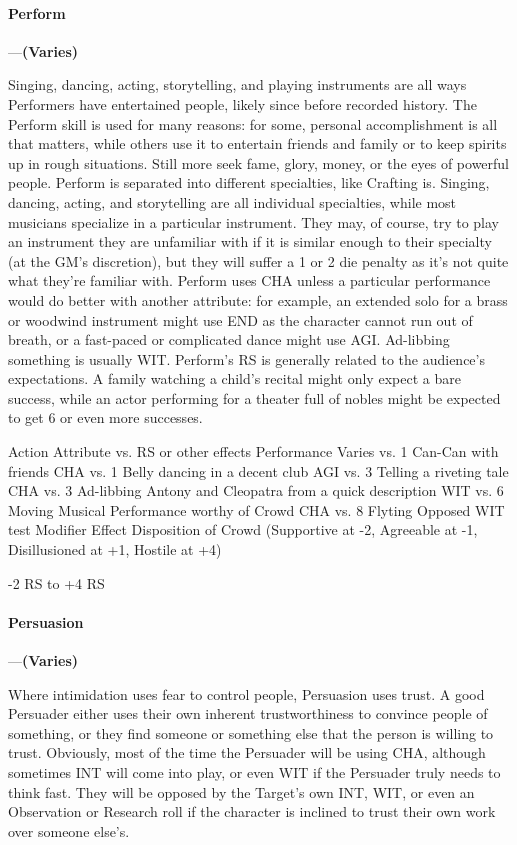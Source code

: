 \documentclass[oneside,11pt,english]{book}
\begin{document}
\paragraph{\label{skill:Perform}Perform}---\quad\textbf{(Varies) }\par
Singing, dancing, acting, storytelling, and playing instruments are all ways Performers have entertained people, likely since before recorded history. The Perform skill is used for many reasons: for some, personal accomplishment is all that matters, while others use it to entertain friends and family or to keep spirits up in rough situations. Still more seek fame, glory, money, or the eyes of powerful people. Perform is separated into different specialties, like Crafting is. Singing, dancing, acting, and storytelling are all individual specialties, while most musicians specialize in a particular instrument. They may, of course, try to play an instrument they are unfamiliar with if it is similar enough to their specialty (at the GM’s discretion), but they will suffer a 1 or 2 die penalty as it’s not quite what they’re familiar with. Perform uses CHA unless a particular performance would do better with another attribute: for example, an extended solo for a brass or woodwind instrument might use END as the character cannot run out of breath, or a fast-paced or complicated dance might use AGI. Ad-libbing something is usually WIT. Perform’s RS is generally related to the audience’s expectations. A family watching a child’s recital might only expect a bare success, while an actor performing for a theater full of nobles might be expected to get 6 or even more successes.


Action Attribute vs. RS or other 
effects 
Performance Varies vs. 1 
Can-Can with friends CHA vs. 1 
Belly dancing in a decent club AGI vs. 3 
Telling a riveting tale CHA vs. 3 
Ad-libbing Antony and Cleopatra from a quick description WIT vs. 6 
Moving Musical Performance worthy of Crowd CHA vs. 8 
Flyting Opposed WIT test 
Modifier Effect 
Disposition of Crowd (Supportive at -2, Agreeable at -1, Disillusioned at 
+1, Hostile at +4) 

-2 RS to +4 RS 

 

 

\paragraph{\label{skill:Persuasion}Persuasion}---\quad\textbf{(Varies) }\par
Where intimidation uses fear to control people, Persuasion uses trust. A good Persuader either uses their own inherent trustworthiness to convince people of something, or they find someone or something else that the person is willing to trust. Obviously, most of the time the Persuader will be using CHA, although sometimes INT will come into play, or even WIT if the Persuader truly needs to think fast. They will be opposed by the Target’s own INT, WIT, or even an Observation or Research roll if the character is inclined to trust their own work over someone else’s.
\end{document}
